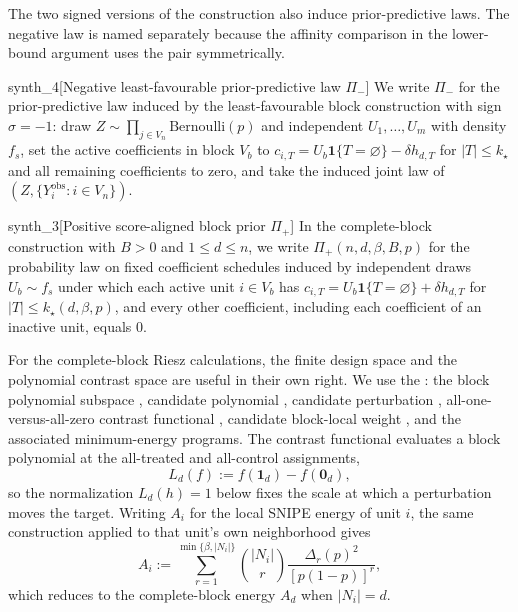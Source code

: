 The two signed versions of the construction also induce prior-predictive laws. The negative law is named separately because the affinity comparison in the lower-bound argument uses the pair symmetrically.

\begin{definitionv}{synth_4}[Negative least-favourable prior-predictive law $\Pi_-$]
We write $\Pi_-$ for the prior-predictive law induced by the least-favourable block construction with sign $\sigma=-1$: draw $Z\sim\prod_{j\in V_n}\mathrm{Bernoulli}(p)$ and independent $U_1,\ldots,U_m$ with density $f_s$, set the active coefficients in block $V_b$ to $c_{i,T}=U_b\mathbf1\{T=\varnothing\}-\delta h_{d,T}$ for $|T|\le k_\star$ and all remaining coefficients to zero, and take the induced joint law of $(Z,\{Y_i^{\mathrm{obs}}:i\in V_n\})$.
\end{definitionv}

\begin{definitionv}{synth_3}[Positive score-aligned block prior $\Pi_+$]
In the complete-block construction with \(B>0\) and \(1\le d\le n\), we write \(\Pi_+(n,d,\beta,B,p)\) for the probability law on fixed coefficient schedules induced by independent draws \(U_b\sim f_s\) under which each active unit \(i\in V_b\) has \(c_{i,T}=U_b\mathbf 1\{T=\varnothing\}+\delta h_{d,T}\) for \(|T|\le k_\star(d,\beta,p)\), and every other coefficient, including each coefficient of an inactive unit, equals \(0\).
\end{definitionv}

For the complete-block Riesz calculations, the finite design space and the polynomial contrast space are useful in their own right. We use the : the block polynomial subspace , candidate polynomial , candidate perturbation , all-one-versus-all-zero contrast functional , candidate block-local weight , and the associated minimum-energy programs. The contrast functional evaluates a block polynomial at the all-treated and all-control assignments,
\[
L_d(f):=f(\mathbf 1_d)-f(\mathbf 0_d),
\]
so the normalization \(L_d(h)=1\) below fixes the scale at which a perturbation moves the target. Writing \(A_i\) for the local SNIPE energy of unit \(i\), the same construction applied to that unit's own neighborhood gives
\[
A_i:=\sum_{r=1}^{\min\{\beta,|N_i|\}}\binom{|N_i|}{r}\frac{\Delta_r(p)^2}{[p(1-p)]^r},
\]
which reduces to the complete-block energy \(A_d\) when \(|N_i|=d\).

